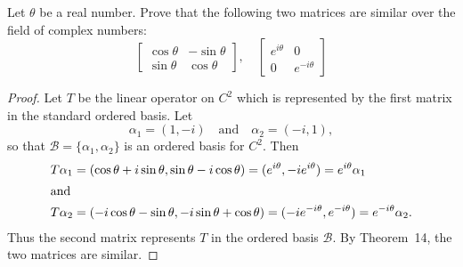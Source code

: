  Let $\theta$ be a real number. Prove that the following two
matrices are similar over the field of complex numbers:
\begin{equation*}
  \begin{bmatrix}
    \cos\theta & -\sin\theta \\
    \sin\theta & \cos\theta
  \end{bmatrix},
  \quad
  \begin{bmatrix}
    e^{i\theta} & 0 \\
    0 & e^{-i\theta}
  \end{bmatrix}
\end{equation*}
\begin{proof}
  Let $T$ be the linear operator on $C^2$ which is represented by the
  first matrix in the standard ordered basis. Let
  \begin{equation*}
    \alpha_1 = (1, -i) \quad\text{and}\quad \alpha_2 = (-i, 1),
  \end{equation*}
  so that $\mathcal{B} = \{\alpha_1,\alpha_2\}$ is an ordered basis
  for $C^2$. Then
  \begin{align*}
    T\alpha_1
    &= (\cos\theta + i\sin\theta, \sin\theta - i\cos\theta)
      = (e^{i\theta}, -ie^{i\theta}) = e^{i\theta}\alpha_1
    \\\intertext{and}
    T\alpha_2
    &= (-i\cos\theta - \sin\theta, -i\sin\theta + \cos\theta)
      = (-ie^{-i\theta}, e^{-i\theta}) = e^{-i\theta}\alpha_2.
  \end{align*}
  Thus the second matrix represents $T$ in the ordered basis
  $\mathcal{B}$. By Theorem~14, the two matrices are similar.
\end{proof}
